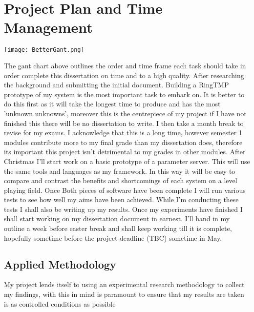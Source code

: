 \clearpage
\section{Project Plan and Time Management}
\texttt{[image: BetterGant.png]}

The gant chart above outlines the order and time frame each task should take in
order complete this dissertation on time and to a high quality. After
researching the background and submitting the initial document. Building a
RingTMP prototype of my system is the most important task to embark on. It is
better to do this first as it will take the longest time to produce and has the
most 'unknown unknowns', moreover this is the centrepiece of my project if I
have not finished this there will be no dissertation to write. I then take a
month break to revise for my exams. I acknowledge that this is a long time,
however semester 1 modules contribute more to my final grade than my
dissertation does, therefore its important this project isn't detrimental to my
grades in other modules. After Christmas I'll start work on a basic prototype of
a parameter server. This will use the same tools and languages as my framework.
In this way it will be easy to compare and contrast the benefits and
shortcomings of each system on a level playing field. Once Both pieces of
software have been complete I will run various tests to see how well my aims
have been achieved. While I'm conducting these tests I shall also be writing up
my results. Once my experiments have finished I shall start working on my
dissertation document in earnest. I'll hand in my outline a week before easter
break and shall keep working till it is complete, hopefully sometime before the
project deadline (TBC) sometime in May.

\subsection{Applied Methodology}

My project lends itself to using an experimental research methodology to collect
my findings, with this in mind is paramount to ensure that my results are taken
is as controlled conditions as possible

